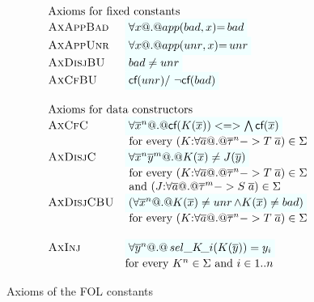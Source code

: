 \begin{figure}\small
\setlength{\arraycolsep}{1pt} 
\[\begin{array}{c} 
\begin{array}{ll} 
\multicolumn{2}{l}{\text{Axioms for fixed constants}} \\
 \textsc{AxAppBad}  & \formula{\forall x @.@ app(\bad,x){=}\bad}  \\
 \textsc{AxAppUnr}  & \formula{\forall x @.@ app(\unr,x){=}\unr}    \\
 \textsc{AxDisjBU} & \formula{\bad \neq \unr}  \\ 
 \textsc{AxCfBU} & \formula{\lcf{\unr} /\ \lncf{\bad}} \\
\\
\multicolumn{2}{l}{\mbox{Axioms for data constructors}} \\
 \textsc{AxCfC}  & \formula{\forall \oln{x}{n} @.@ \lcf{K(\ol{x})} <=> \bigwedge\lcf{\ol{x}}} \\
                 & \text{ for every } (K{:}\forall\as @.@ \oln{\tau}{n} -> T\;\as) \in \Sigma \\
 \textsc{AxDisjC} & \formula{\forall \oln{x}{n}\oln{y}{m} @.@ K(\ol{x}) \neq J(\ol{y})} \\ 
                  & \text{ for every } (K{:}\forall\as @.@ \oln{\tau}{n} -> T\;\as) \in \Sigma \\ 
                  & \text{ and } (J{:}\forall\as @.@ \oln{\tau}{m} -> S\;\as) \in \Sigma \\
 \textsc{AxDisjCBU} & \formula{(\forall \oln{x}{n} @.@ K(\ol{x}) \neq \unr \land K(\ol{x}) \neq \bad)} \\ 
                  & \text{ for every } (K{:}\forall\as @.@ \oln{\tau}{n} -> T\;\as) \in \Sigma \\ \\
 \textsc{AxInj}   & \formula{\forall \oln{y}{n} @.@ \sel{K}{i}(K(\ys)) = y_i} \\ 
                  & \text{for every } K^\ar \in \Sigma \text{ and } i \in 1..n
\end{array}
\end{array}\]
\caption{Axioms of the FOL constants}\label{fig:prelude}
\end{figure}

